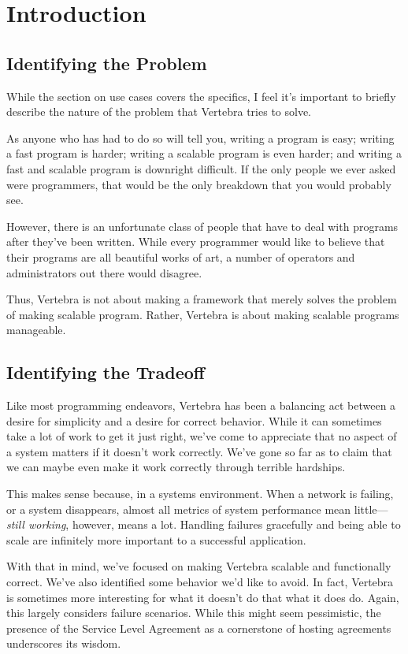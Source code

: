 \chapter{Introduction}

\section*{Identifying the Problem}

While the section on use cases covers the specifics, I feel it's important to briefly describe the nature of the problem that Vertebra tries to solve.

As anyone who has had to do so will tell you, writing a program is easy; writing a fast program is harder; writing a scalable program is even harder; and writing a fast and scalable program is downright difficult.  If the only people we ever asked were programmers, that would be the only breakdown that you would probably see.

However, there is an unfortunate class of people that have to deal with programs after they've been written.  While every programmer would like to believe that their programs are all beautiful works of art, a number of operators and administrators out there would disagree.

Thus, Vertebra is not about making a framework that merely solves the problem of making scalable program.  Rather, Vertebra is about making scalable programs manageable.  

\section*{Identifying the Tradeoff}

Like most programming endeavors, Vertebra has been a balancing act between a desire for simplicity and a desire for correct behavior.  While it can sometimes take a lot of work to get it just right, we've come to appreciate that no aspect of a system matters if it doesn't work correctly.  We've gone so far as to claim that we can maybe even make it work correctly through terrible hardships.

This makes sense because, in a systems environment.  When a network is failing, or a system disappears, almost all metrics of system performance mean little---\emph{still working}, however, means a lot.  Handling failures gracefully and being able to scale are infinitely more important to a successful application.

With that in mind, we've focused on making Vertebra scalable and functionally correct.  We've also identified some behavior we'd like to avoid.  In fact, Vertebra is sometimes more interesting for what it doesn't do that what it does do.  Again, this largely considers failure scenarios.  While this might seem pessimistic, the presence of the Service Level Agreement as a cornerstone of hosting agreements underscores its wisdom.

